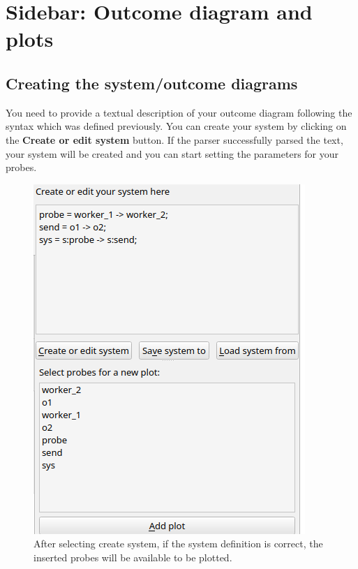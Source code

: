 \section{Sidebar: Outcome diagram and plots}

    \subsection{Creating the system/outcome diagrams}

    You need to provide a textual description of your outcome diagram following the syntax which was defined previously.
    You can create your system by clicking on the \textbf{Create or edit system} button. If the parser successfully parsed the text, your system will be created and you can start setting the parameters for your probes.
    
    \begin{figure}[H]
        \begin{center}
            \includegraphics[width = \textwidth]{img/manual/after_create.png}
        \end{center}
        \caption{After selecting create system, if the system definition is correct, the inserted probes will be available to be plotted.}
    \end{figure}

